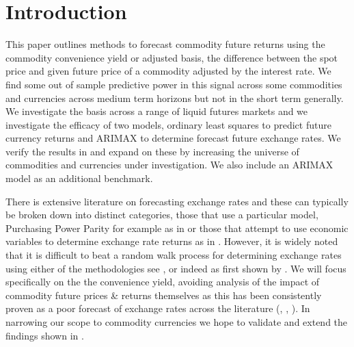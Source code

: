 \section{Introduction}
This paper outlines methods to forecast commodity future returns using the commodity convenience yield or adjusted basis, the difference between the spot price and given future price of a commodity adjusted by the interest rate. We find some out of sample predictive power in this signal across some commodities and currencies across medium term horizons but not in the short term generally. We investigate the basis across a range of liquid futures markets and we investigate the efficacy of two models, ordinary least squares to predict future currency returns and ARIMAX to determine forecast future exchange rates. We verify the results in \cite{mainref} and expand on these by increasing the universe of commodities and currencies under investigation. We also include an ARIMAX model as an additional benchmark.

There is extensive literature on forecasting exchange rates and these can typically be broken down into distinct categories, those that use a particular model, Purchasing Power Parity for example as in \cite{ecbnapkin} or those that attempt to use economic variables to determine exchange rate returns as in \cite{meese}. However, it is widely noted that it is difficult to beat a random walk process for determining exchange rates using either of the methodologies see \cite{ecbnapkin}, \cite{engel} or indeed as first shown by \cite{meese}. We will focus specifically on the the convenience yield, avoiding analysis of the impact of commodity future prices \& returns themselves as this has been consistently proven as a poor forecast of exchange rates across the literature (\cite{oilpricrogoff}, \cite{engel}, \cite{mainref}). In narrowing our scope to commodity currencies we hope to validate and extend the findings shown in \cite{mainref}. 


